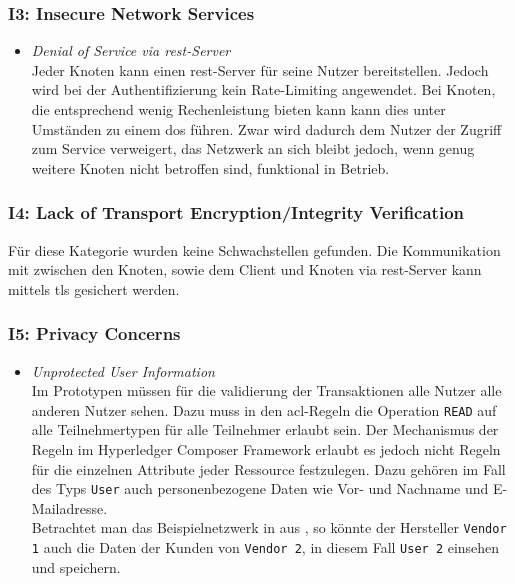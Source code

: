         \subsubsection*{I3: Insecure Network Services}
            \begin{itemize}[leftmargin=0cm,label={}]
                \item \emph{Denial of Service via \gls{rest}-Server}\label{vuln:prototype_dos}\\
        	        Jeder Knoten kann einen \gls{rest}-Server für seine Nutzer bereitstellen. 
        	        Jedoch wird bei der Authentifizierung kein Rate-Limiting angewendet. 
        	        Bei Knoten, die entsprechend wenig Rechenleistung bieten kann kann dies unter Umständen zu einem \gls{dos} führen. 
        	        Zwar wird dadurch dem Nutzer der Zugriff zum Service verweigert, das Netzwerk an sich bleibt jedoch, wenn genug weitere Knoten nicht betroffen sind, funktional in Betrieb.
            \end{itemize}
            
        \subsubsection*{I4: Lack of Transport Encryption/Integrity Verification}
            Für diese Kategorie wurden keine Schwachstellen gefunden. 
            Die Kommunikation mit zwischen den Knoten, sowie dem Client und Knoten via \gls{rest}-Server kann mittels \gls{tls} gesichert werden. 
            
        \subsubsection*{I5: Privacy Concerns}
            \begin{itemize}[leftmargin=0cm,label={}]
                \item \emph{Unprotected User Information}\label{vuln:prototype_userdata}\\
                    Im Prototypen müssen für die validierung der Transaktionen alle Nutzer alle anderen Nutzer sehen. 
                    Dazu muss in den \gls{acl}-Regeln die Operation \colorbox{light-gray}{\lstinline{READ}} auf alle Teilnehmertypen für alle Teilnehmer erlaubt sein. 
                    Der Mechanismus der Regeln im Hyperledger Composer Framework erlaubt es jedoch nicht Regeln für die einzelnen Attribute jeder Ressource festzulegen. 
                    Dazu gehören im Fall des Typs \colorbox{light-gray}{\lstinline{User}} auch personenbezogene Daten wie Vor- und Nachname und E-Mailadresse.\\
                    Betrachtet man das Beispielnetzwerk in  aus , so könnte der Hersteller \colorbox{light-gray}{\lstinline{Vendor 1}} auch die Daten der Kunden von \colorbox{light-gray}{\lstinline{Vendor 2}}, in diesem Fall \colorbox{light-gray}{\lstinline{User 2}} einsehen und speichern.
            \end{itemize}
            
